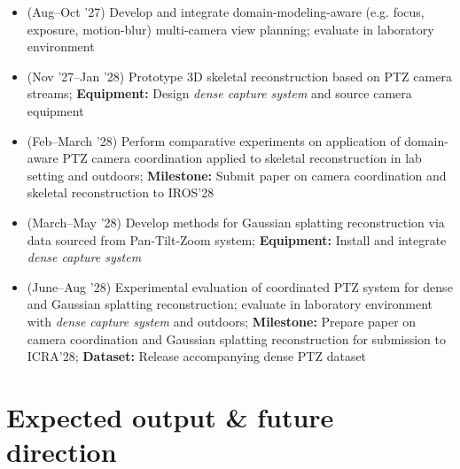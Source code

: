 \documentclass[11pt]{article}
\begin{document}
\begin{itemize}[itemsep=0.3ex,topsep=0.3ex]
  \item (Aug--Oct '27) Develop and integrate domain-modeling-aware
    (e.g. focus, exposure, motion-blur)
    multi-camera view planning; evaluate in laboratory environment
  \item (Nov '27--Jan '28) Prototype 3D skeletal reconstruction based on
    PTZ camera streams;
    \textbf{Equipment:} Design \emph{dense capture system} and source camera
    equipment
  \item (Feb--March '28)
    Perform comparative experiments on application of domain-aware
    PTZ camera coordination applied to skeletal reconstruction in lab setting
    and outdoors;
   \textbf{Milestone:} Submit paper on camera coordination and skeletal
   reconstruction to IROS'28
  \item (March--May '28)
    Develop methods for Gaussian splatting reconstruction via data sourced from
    Pan-Tilt-Zoom system;
    \textbf{Equipment:} Install and integrate \emph{dense capture system}
  \item (June--Aug '28)
    Experimental evaluation of coordinated PTZ system for
    dense and Gaussian splatting reconstruction; evaluate in laboratory
    environment with \emph{dense capture system} and outdoors;
    \textbf{Milestone:}
    Prepare paper on camera coordination and Gaussian splatting
    reconstruction for submission to ICRA'28;
    \textbf{Dataset:} Release accompanying dense PTZ dataset
\end{itemize}

\section{Expected output \& future direction}
\end{document}

